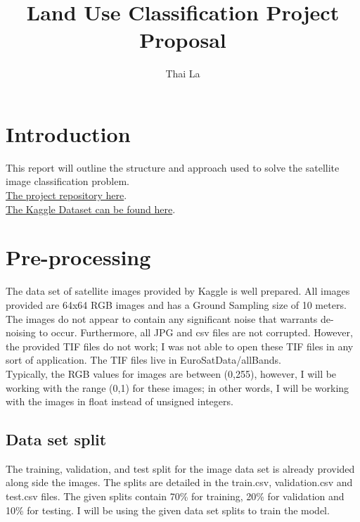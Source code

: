 \documentclass[acmtog]{acmart}
\begin{document}
	\title{Land Use Classification Project Proposal}
	
	\author{Thai La}
	
	
	\maketitle
	
	\section{Introduction}
	This report will outline the structure and approach used to solve the satellite image classification problem.\\
	\href{https://git.cs.usask.ca/vtl932/cmpt318_course_project}{The project repository here}.\\
	\href{https://www.kaggle.com/datasets/apollo2506/eurosat-dataset?select=EuroSAT}{The Kaggle Dataset can be found here}.
	
	\section{Pre-processing}
	The data set of satellite images provided by Kaggle is well prepared. All images provided are 64x64 RGB images and has a Ground Sampling size of 10 meters. The images do not appear to contain any significant noise that warrants de-noising to occur. Furthermore, all JPG and csv files are not corrupted. However, the provided TIF files do not work; I was not able to open these TIF files in any sort of application. The TIF files live in EuroSatData/allBands.\\
	Typically, the RGB values for images are between (0,255), however, I will be working with the range (0,1) for these images; in other words, I will be working with the images in float instead of unsigned integers.
	
		\subsection{Data set split}
		
		The training, validation, and test split for the image data set is already provided along side the images. The splits are detailed in the train.csv, validation.csv and test.csv files. The given splits contain 70\% for  training, 20\% for validation and 10\% for testing. I will be using the given data set splits to train the model.
	
\end{document}
